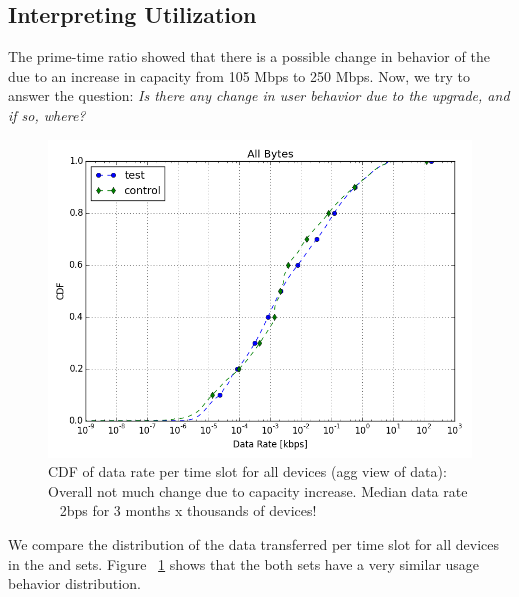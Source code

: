 \subsection{Interpreting Utilization}
\label{subsec:utilization}

The prime-time ratio showed that there is a possible change in behavior of the \test due to an increase in capacity from 105 Mbps to 250 Mbps. Now, we try to answer the question: \emph{Is there any change in user behavior due to the upgrade, and if so, where?}

\begin{figure}[ht!]
\centering
\includegraphics[width=0.90\linewidth]{figures/cdf-all-bytes.png}
  \caption{CDF of data rate per time slot for all devices (agg view of data): Overall not much change due to capacity increase. Median data rate ~ 2bps for 3 months x thousands of devices!}
  \label{fig:CDF-data-rate-all}
\end{figure}

We compare the distribution of the data transferred per time slot for all devices in the \test and \control sets. Figure ~\ref{fig:CDF-data-rate-all} shows that the both sets have a very similar usage behavior distribution.

